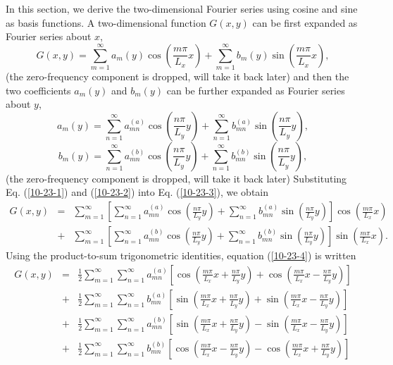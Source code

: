 \documentclass{article}
\begin{document}
In this section, we derive the two-dimensional Fourier series using cosine and
sine as basis functions. A two-dimensional function $G (x, y)$ can be first
expanded as Fourier series about $x$,
\begin{equation}
  \label{10-23-3} G (x, y) = \sum_{m = 1}^{\infty} a_m (y) \cos \left( \frac{m
  \pi}{L_x} x \right) + \sum_{m = 1}^{\infty} b_m (y) \sin \left( \frac{m
  \pi}{L_x} x \right),
\end{equation}
(the zero-frequency component is dropped, will take it back later) and then
the two coefficients $a_m (y)$ and $b_m (y)$ can be further expanded as
Fourier series about $y$,
\begin{equation}
  \label{10-23-1} a_m (y) = \sum_{n = 1}^{\infty} a_{m n}^{(a)} \cos \left(
  \frac{n \pi}{L_y} y \right) + \sum_{n = 1}^{\infty} b_{m n}^{(a)} \sin
  \left( \frac{n \pi}{L_y} y \right),
\end{equation}
\begin{equation}
  \label{10-23-2} b_m (y) = \sum_{n = 1}^{\infty} a_{m n}^{(b)} \cos \left(
  \frac{n \pi}{L_y} y \right) + \sum_{n = 1}^{\infty} b_{m n}^{(b)} \sin
  \left( \frac{n \pi}{L_y} y \right),
\end{equation}
(the zero-frequency component is dropped, will take it back later)
Substituting Eq. (\ref{10-23-1}) and (\ref{10-23-2}) into Eq. (\ref{10-23-3}),
we obtain
\begin{eqnarray}
  G (x, y) & = & \sum_{m = 1}^{\infty} \left[ \sum_{n = 1}^{\infty} a_{m
  n}^{(a)} \cos \left( \frac{n \pi}{L_y} y \right) + \sum_{n = 1}^{\infty}
  b_{m n}^{(a)} \sin \left( \frac{n \pi}{L_y} y \right) \right] \cos \left(
  \frac{m \pi}{L_x} x \right) \nonumber\\
  & + & \sum_{m = 1}^{\infty} \left[ \sum_{n = 1}^{\infty} a_{m n}^{(b)} \cos
  \left( \frac{n \pi}{L_y} y \right) + \sum_{n = 1}^{\infty} b_{m n}^{(b)}
  \sin \left( \frac{n \pi}{L_y} y \right) \right] \sin \left( \frac{m
  \pi}{L_x} x \right) .  \label{10-23-4}
\end{eqnarray}
Using the product-to-sum trigonometric identities, equation (\ref{10-23-4}) is
written
\begin{eqnarray*}
  G (x, y) & = & \frac{1}{2} \sum_{m = 1}^{\infty} \sum_{n = 1}^{\infty} a_{m
  n}^{(a)} \left[ \cos \left( \frac{m \pi}{L_x} x + \frac{n \pi}{L_y} y
  \right) + \cos \left( \frac{m \pi}{L_x} x - \frac{n \pi}{L_y} y \right)
  \right]\\
  & + & \frac{1}{2} \sum_{m = 1}^{\infty} \sum_{n = 1}^{\infty} b_{m n}^{(a)}
  \left[ \sin \left( \frac{m \pi}{L_x} x + \frac{n \pi}{L_y} y \right) + \sin
  \left( \frac{m \pi}{L_x} x - \frac{n \pi}{L_y} y \right) \right]\\
  & + & \frac{1}{2} \sum_{m = 1}^{\infty} \sum_{n = 1}^{\infty} a_{m n}^{(b)}
  \left[ \sin \left( \frac{m \pi}{L_x} x + \frac{n \pi}{L_y} y \right) - \sin
  \left( \frac{m \pi}{L_x} x - \frac{n \pi}{L_y} y \right) \right]\\
  & + & \frac{1}{2} \sum_{m = 1}^{\infty} \sum_{n = 1}^{\infty} b_{m n}^{(b)}
  \left[ \cos \left( \frac{m \pi}{L_x} x - \frac{n \pi}{L_y} y \right) - \cos
  \left( \frac{m \pi}{L_x} x + \frac{n \pi}{L_y} y \right) \right]
\end{eqnarray*}
\end{document}
